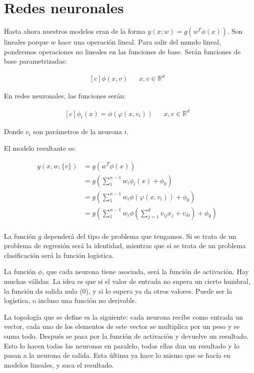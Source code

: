 \section{Redes neuronales}
Hasta ahora nuestros modelos eran de la forma $y(x; w) = g(w^T\phi(x))$. Son lineales porque $w$ hace una operación lineal. Para salir del mundo lineal, pondremos operaciones no lineales en las funciones de base. Serán funciones de base parametrizadas:

\begin{equation*}
\begin{aligned}[c]
    \phi(x,v) && x,v \in \mathbb{R}^d
\end{aligned}
\end{equation*}

En redes neuronales, las funciones serán:

\begin{equation*}
\begin{aligned}[c]
    \phi_i(x) = \phi(\varphi(x, v_i)) && x,v \in \mathbb{R}^d
\end{aligned}
\end{equation*}

Donde $v_i$ son parámetros de la neurona $i$.

El modelo resultante es:

\begin{align*}
    y(x,w,\{v\}) &= g(w^T\phi(x)) \\
    &= g(\sum_{1}^{n - 1} w_i\phi_i(x) + \phi_0) \\
    &= g(\sum_{1}^{n - 1} w_i\phi(\varphi(x, v_i)) + \phi_0) \\
    &= g(\sum_{1}^{n - 1} w_i\phi(\sum_{j = 1}^{d} v_{ij}x_j + v_{i0}) + \phi_0) \\
\end{align*}

La función $g$ dependerá del tipo de problema que tengamos. Si se trata de un problema de regresión será la identidad, mientras que si se trata de un problema clasificación será la función logística.

La función $\phi$, que cada neurona tiene asociada, será la función de activación. Hay muchas válidas. La idea es que si el valor de entrada no supera un cierto humbral, la función da salida nula ($0$), y si lo supera ya da otros valores. Puede ser la logística, o incluso una función no derivable.

La topología que se define es la siguiente: cada neurona recibe como entrada un vector, cada uno de los elementos de este vector se multiplica por un peso y se suma todo. Después se pasa por la función de activación y devuelve un resultado. Esto lo hacen todas las neuronas en paralelo, todas ellas dan un resultado y lo pasan a la neurona de salida. Esta última ya hace lo mismo que se hacía en modelos lineales, y saca el resultado.

